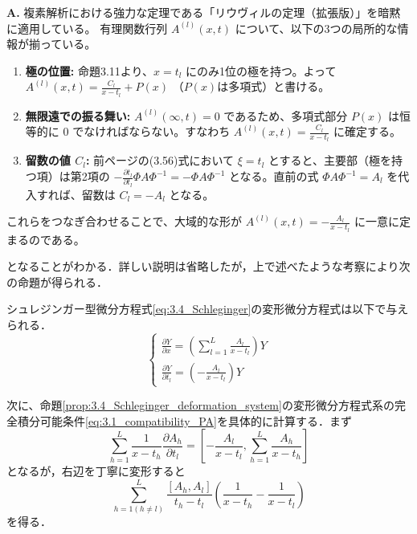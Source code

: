 \begin{Q}
\textbf{A.} 複素解析における強力な定理である「リウヴィルの定理（拡張版）」を暗黙に適用している。
有理関数行列 $A^{(l)}(x,t)$ について、以下の3つの局所的な情報が揃っている。
\begin{enumerate}
    \item \textbf{極の位置:} 命題3.11より、$x=t_l$ にのみ1位の極を持つ。よって $A^{(l)}(x,t) = \frac{C_l}{x-t_l} + P(x)$ （$P(x)$は多項式）と書ける。
    \item \textbf{無限遠での振る舞い:} $A^{(l)}(\infty,t) = 0$ であるため、多項式部分 $P(x)$ は恒等的に $0$ でなければならない。すなわち $A^{(l)}(x,t) = \frac{C_l}{x-t_l}$ に確定する。
    \item \textbf{留数の値 $C_l$:} 前ページの(3.56)式において $\xi = t_l$ とすると、主要部（極を持つ項）は第2項の $- \frac{\partial t_l}{\partial t_l} \Phi A \Phi^{-1} = -\Phi A \Phi^{-1}$ となる。直前の式 $\Phi A \Phi^{-1} = A_l$ を代入すれば、留数は $C_l = -A_l$ となる。
\end{enumerate}
これらをつなぎ合わせることで、大域的な形が $A^{(l)}(x,t) = - \frac{A_l}{x-t_l}$ に一意に定まるのである。
\end{Q}

となることがわかる．詳しい説明は省略したが，上で述べたような考察により次の命題が得られる．

\begin{proposition}\label{prop:3.4_Schleginger_deformation_system}
シュレジンガー型微分方程式\eqref{eq:3.4_Schleginger}の変形微分方程式は以下で与えられる．
\begin{equation*}
  \begin{cases}
    \displaystyle \frac{\partial Y}{\partial x} = \left( \sum_{l=1}^L \frac{A_l}{x-t_l} \right) Y \\[5mm]
    \displaystyle \frac{\partial Y}{\partial t_l} = \left( - \frac{A_l}{x-t_l} \right) Y
  \end{cases}
\end{equation*}
\end{proposition}

次に、命題\ref{prop:3.4_Schleginger_deformation_system}の変形微分方程式系の完全積分可能条件\eqref{eq:3.1_compatibility_PA}を具体的に計算する．まず
\[
  \sum_{h=1}^L \frac{1}{x-t_h} \frac{\partial A_h}{\partial t_l} = \left[ -\frac{A_l}{x-t_l}, \sum_{h=1}^L \frac{A_h}{x-t_h} \right]
\]
となるが，右辺を丁寧に変形すると
\[
  \sum_{h=1(h \neq l)}^L \frac{[A_h, A_l]}{t_h - t_l} \left( \frac{1}{x-t_h} - \frac{1}{x-t_l} \right)
\]
を得る．

